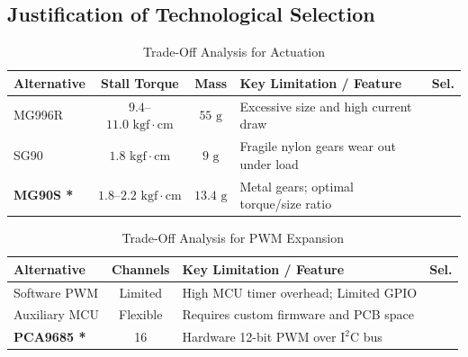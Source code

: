 \documentclass[lettersize,journal]{IEEEtran}
\begin{document}
	
	\subsection{Justification of Technological Selection}
	
	\begin{table}[!t]
		\centering
		\caption{Trade-Off Analysis for Actuation}
		\label{tab:alt_actuation}
		\scriptsize
		\setlength{\tabcolsep}{2.5pt}
		\renewcommand{\arraystretch}{1.1}
		\begin{tabularx}{\columnwidth}{@{}l c c X c@{}}
			\toprule
			\textbf{Alternative} & \textbf{Stall Torque} & \textbf{Mass} & \textbf{Key Limitation / Feature} & \textbf{Sel.} \\
			\midrule
			MG996R \cite{mg996r} & $9.4$--$11.0\text{ kgf}\cdot\text{cm}$ & $55\text{ g}$ & Excessive size and high current draw & \\
			SG90 \cite{sg90} & $1.8\text{ kgf}\cdot\text{cm}$ & $9\text{ g}$ & Fragile nylon gears wear out under load & \\
			\textbf{MG90S \cite{mg90s}*} & $1.8$--$2.2\text{ kgf}\cdot\text{cm}$ & $13.4\text{ g}$ & Metal gears; optimal torque/size ratio & \checkmark \\
			\bottomrule
		\end{tabularx}
	\end{table}
	
	\begin{table}[!t]
		\centering
		\caption{Trade-Off Analysis for PWM Expansion}
		\label{tab:alt_pwm}
		\scriptsize
		\setlength{\tabcolsep}{3pt}
		\renewcommand{\arraystretch}{1.1}
		\begin{tabularx}{\columnwidth}{@{}l c X c@{}}
			\toprule
			\textbf{Alternative} & \textbf{Channels} & \textbf{Key Limitation / Feature} & \textbf{Sel.} \\
			\midrule
			Software PWM \cite{esp32c3} & Limited & High MCU timer overhead; Limited GPIO & \\
			Auxiliary MCU \cite{stm32f4} & Flexible & Requires custom firmware and PCB space & \\
			\textbf{PCA9685 \cite{pca9685}*} & 16 & Hardware 12-bit PWM over $\text{I}^2\text{C}$ bus & \checkmark \\
			\bottomrule
		\end{tabularx}
	\end{table}
	
\end{document}
